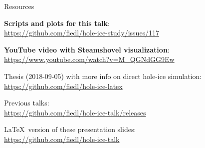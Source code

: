 
\begin{frame}{Resources}
  \begin{center}
    \textbf{Scripts and plots for this talk}: \\ \vspace{0.2cm}
    \url{https://github.com/fiedl/hole-ice-study/issues/117}

    \vspace{1cm}

    \textbf{YouTube video with Steamshovel visualization}: \\ \vspace{0.2cm}
    \url{https://www.youtube.com/watch?v=M_QGNdGG9Ew}

    \vspace{1cm}

    Thesis (2018-09-05) with more info on direct hole-ice simulation: \\ \vspace{0.2cm}
    \url{https://github.com/fiedl/hole-ice-latex}

    \vspace{1cm}

    Previous talks: \\ \vspace{0.2cm}
    \url{https://github.com/fiedl/hole-ice-talk/releases}

    \vspace{1cm}

    \LaTeX\ version of these presentation slides: \\ \vspace{0.2cm}
    \url{https://github.com/fiedl/hole-ice-talk}
  \end{center}
\end{frame}

